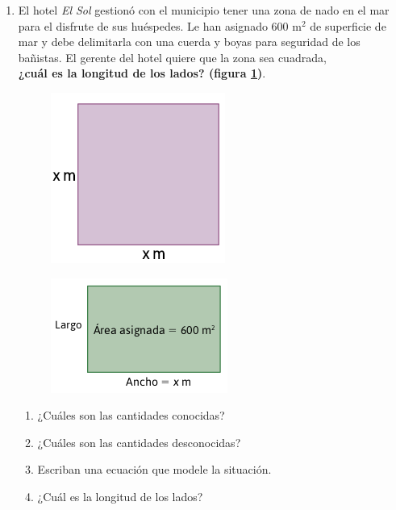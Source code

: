 \documentclass[11pt]{book}
\begin{document}
\begin{enumerate}
  \item El hotel \emph{El Sol} gestionó con el municipio tener una zona de nado en el mar
        para el disfrute de sus huéspedes. Le han asignado 600 m$^2$ de superficie
        de mar y debe delimitarla con una cuerda y boyas para seguridad de los
        bañistas. El gerente del hotel quiere que la zona sea cuadrada, \\
        \textbf{¿cuál es la longitud de los lados? (figura \ref{fig:square})}.

        \begin{minipage}{.45\textwidth}
          \begin{figure}[H]
            \centering
            \includegraphics[width=0.4\linewidth]{square.png}
            \label{fig:square}
          \end{figure}%
        \end{minipage}\hfill
        \begin{minipage}{.45\textwidth}
          \begin{figure}[H]
            \centering
            \includegraphics[width=0.6\linewidth]{square2.png}
            \label{fig:square2}
          \end{figure}
        \end{minipage}

        \begin{enumerate}
          \item ¿Cuáles son las cantidades conocidas?
          \item ¿Cuáles son las cantidades desconocidas?
          \item Escriban una ecuación que modele la situación.
          \item ¿Cuál es la longitud de los lados?
        \end{enumerate}


\end{enumerate}
\end{document}
